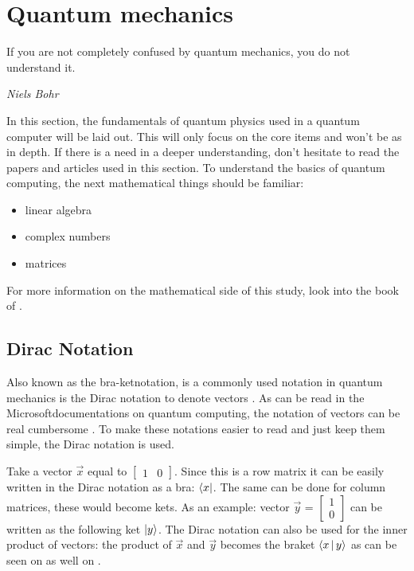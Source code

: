 \section{Quantum mechanics} \label{quantum mechanics}
\epigraph{If you are not completely confused by quantum mechanics, you do not understand it.}{\textit{Niels Bohr}}

In this section, the fundamentals of quantum physics used in a quantum computer will be laid out.
This will only focus on the core items and won't be as in depth. If there is a need in a deeper understanding, don't hesitate to read the papers and articles used in this section.
To understand the basics of quantum computing, the next mathematical things should be familiar:

\begin{itemize}
    \item linear algebra
    \item complex numbers
    \item matrices
\end{itemize}

For more information on the mathematical side of this study, look into the book of \textcite{bernhardt_2019}.

\subsection{Dirac Notation} \label{Dirac}
Also known as the bra-ketnotation, is a commonly used notation in quantum mechanics is the Dirac notation to denote vectors \autocite{Dirac_Notation2020}.
As can be read in the Microsoft\textregistered documentations on quantum computing, the notation of vectors can be real cumbersome \autocite{Microsoft_Dirac}. To make these notations easier to read and just keep them simple, the Dirac notation is used.

Take a vector $\vec{x}$ equal to $\begin{bmatrix}
    1 & 0 
\end{bmatrix}$.
Since this is a row matrix it can be easily written in the Dirac notation as a bra: $\bra{x}$. The same can be done for column matrices, these would become kets. As an example:
vector $\vec{y}$ = $\begin{bmatrix}
    1 \\
    0
\end{bmatrix}$ can be written as the following ket $\ket{y}$.
The Dirac notation can also be used for the inner product of vectors: the product of $\vec{x}$ and $\vec{y}$ becomes the braket $\Braket{x|y}$ as can be seen on \textcite{Dirac_Notation2020} as well on \textcite{Microsoft_Dirac}.

